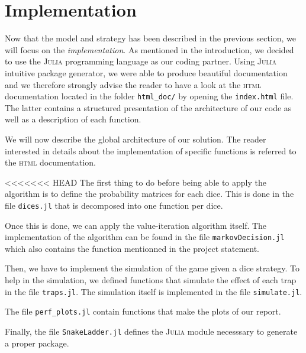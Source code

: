 \section{Implementation} %
\label{sec:implementation}
Now that the model and strategy has been described in the previous
section, we will focus on the \emph{implementation}.
As mentioned in the introduction, we decided to use the \textsc{Julia}
programming language as our coding partner.
Using \textsc{Julia} intuitive package generator, we were able to
produce beautiful documentation and we therefore strongly advise
the reader to have a look at the \textsc{html} documentation located
in the folder \lstinline|html_doc/| by opening the \texttt{index.html} file.
The latter contains a structured presentation of the architecture
of our code as well as a description of each function.

We will now describe the global architecture of our solution. 
The reader interested in details about the implementation of
specific functions is referred to the \textsc{html} documentation. 

<<<<<<< HEAD
The first thing to do before being able to apply the algorithm
is to define the probability matrices for each dice. 
This is done in the file \texttt{dices.jl} that is decomposed into
one function per dice. 

Once this is done, we can apply the value-iteration algorithm itself. 
The implementation of the algorithm can be found in the file \texttt{markovDecision.jl}
which also contains the function mentionned in the project statement. 

Then, we have to implement the simulation of the game given a dice strategy.
To help in the simulation, we defined functions that simulate the effect
of each trap in the file \texttt{traps.jl}. The simulation itself is
implemented in the file \texttt{simulate.jl}. 

The file \texttt{perf\_plots.jl} contain functions that make the plots
of our report. 

Finally, the file \texttt{SnakeLadder.jl} defines the \textsc{Julia} module
necesssary to generate a proper package. 

